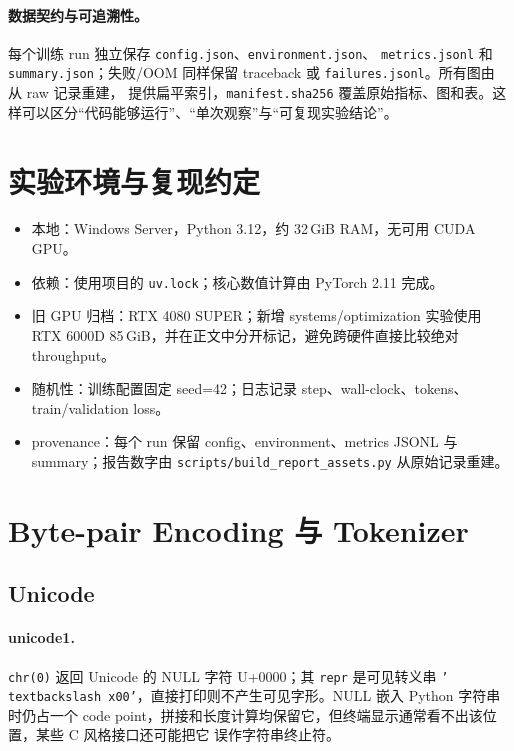 \documentclass[UTF8,a4paper,11pt]{ctexart}
\begin{document}
\paragraph{数据契约与可追溯性。}
每个训练 run 独立保存 \texttt{config.json}、\texttt{environment.json}、
\texttt{metrics.jsonl} 和 \texttt{summary.json}；失败/OOM 同样保留 traceback 或
\texttt{failures.jsonl}。所有图由  从 raw
记录重建， 提供扁平索引，\texttt{manifest.sha256}
覆盖原始指标、图和表。这样可以区分``代码能够运行''、``单次观察''与``可复现实验结论''。

\section{实验环境与复现约定}
\begin{itemize}
  \item 本地：Windows Server，Python 3.12，约 32\,GiB RAM，无可用 CUDA GPU。
  \item 依赖：使用项目的 \texttt{uv.lock}；核心数值计算由 PyTorch 2.11 完成。
  \item 旧 GPU 归档：RTX 4080 SUPER；新增 systems/optimization 实验使用 RTX 6000D
  85\,GiB，并在正文中分开标记，避免跨硬件直接比较绝对 throughput。
  \item 随机性：训练配置固定 seed=42；日志记录 step、wall-clock、tokens、train/validation loss。
  \item provenance：每个 run 保留 config、environment、metrics JSONL 与 summary；报告数字由
  \texttt{scripts/build\_report\_assets.py} 从原始记录重建。
\end{itemize}

\section{Byte-pair Encoding 与 Tokenizer}
\subsection{Unicode}
\paragraph{unicode1.}
\texttt{chr(0)} 返回 Unicode 的 NULL 字符 U+0000；其 \texttt{repr} 是可见转义串
\texttt{'\\textbackslash x00'}，直接打印则不产生可见字形。NULL 嵌入 Python 字符串时仍占一个
code point，拼接和长度计算均保留它，但终端显示通常看不出该位置，某些 C 风格接口还可能把它
误作字符串终止符。
\end{document}
